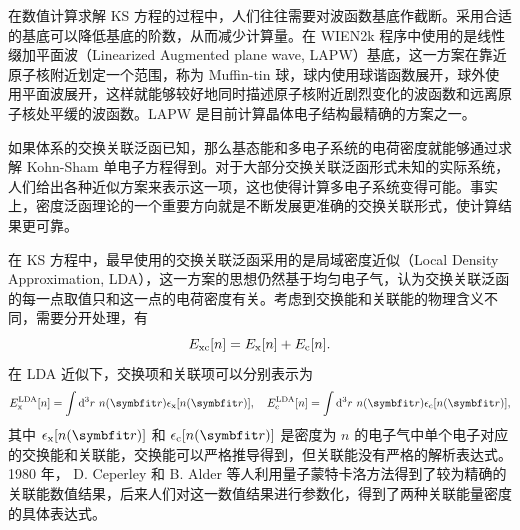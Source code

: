 在数值计算求解 KS 方程的过程中，人们往往需要对波函数基底作截断。采用合适的基底可以降低基底的阶数，从而减少计算量。在 WIEN2k 程序\cite{WIEN2k}中使用的是线性缀加平面波（Linearized Augmented plane wave, LAPW）基底，这一方案在靠近原子核附近划定一个范围，称为 Muffin-tin 球，球内使用球谐函数展开，球外使用平面波展开，这样就能够较好地同时描述原子核附近剧烈变化的波函数和远离原子核处平缓的波函数\cite{lapw}。LAPW 是目前计算晶体电子结构最精确的方案之一。

如果体系的交换关联泛函已知，那么基态能和多电子系统的电荷密度就能够通过求解 Kohn-Sham 单电子方程得到。对于大部分交换关联泛函形式未知的实际系统，人们给出各种近似方案来表示这一项，这也使得计算多电子系统变得可能。事实上，密度泛函理论的一个重要方向就是不断发展更准确的交换关联形式，使计算结果更可靠。

在 KS 方程中，最早使用的交换关联泛函采用的是局域密度近似（Local Density Approximation, LDA），这一方案的思想仍然基于均匀电子气，认为交换关联泛函的每一点取值只和这一点的电荷密度有关。考虑到交换能和关联能的物理含义不同，需要分开处理，有
\begin{equation}
    E_{\mathrm{xc}}[n]=E_{\mathrm{x}}[n]+E_{\mathrm{c}}[n].
\end{equation}
在 LDA 近似下，交换项和关联项可以分别表示为 
\begin{equation}
    E_{\fun{x}}^{\fun{LDA}}[n]=\int \dd^3 r\ n(\vct{r})\epsilon_{\fun{x}}[n(\vct{r})],\quad E_{\fun{c}}^{\fun{LDA}}[n]=\int \dd^3 r\ n(\vct{r})\epsilon_{\fun{c}}[n(\vct{r})],
\end{equation}
其中 $\epsilon_{\fun{x}}[n(\vct{r})]$ 和 $\epsilon_{\fun{c}}[n(\vct{r})]$ 是密度为 $n$ 的电子气中单个电子对应的交换能和关联能，交换能可以严格推导得到，但关联能没有严格的解析表达式。1980 年， D. Ceperley 和 B. Alder 等人利用量子蒙特卡洛方法得到了较为精确的关联能数值结果\cite{PhysRevLett.45.566}，后来人们对这一数值结果进行参数化，得到了两种关联能量密度的具体表达式\cite{PhysRevB.23.5048,PhysRevB.45.13244}。

